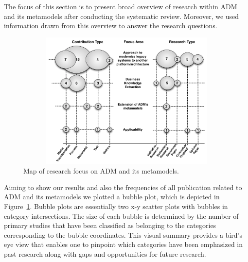 

The focus of this section is to present broad overview of research within ADM and its metamodels after conducting the systematic review. Moreover, we used information drawn from this overview to answer the research questions. 
\begin{figure}[t]
\centering
  \includegraphics[width=16.9cm, height=6.9cm]{figuras/MapaNOVO4}
\caption{Map of research focus on ADM and its metamodels.}
\label{map}
\end{figure} 
Aiming to show our results and also the frequencies of all publication related to ADM and its metamodels we plotted a bubble plot, which is depicted in Figure~\ref{map}. Bubble plots are essentially two x-y scatter plots with bubbles in category intersections. The size of each bubble is determined by the number of primary studies that have been classified as belonging to the categories corresponding to the bubble coordinates. This visual summary provides a bird's-eye view that enables one to pinpoint which categories have been emphasized in past research along with gaps and opportunities for future research.


